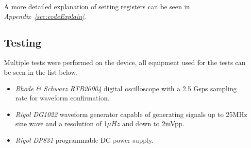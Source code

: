 A more detailed explanation of setting registers can be seen in \textit{Appendix~\ref{sec:codeExplain}}.

\clearpage

\subsection{Testing}









Multiple tests were performed on the device, all equipment used for the tests can be seen in the list below.
\begin{itemize}
    \item \textit{Rhode \& Schwarz RTB20004} digital oscilloscope with a 2.5 Gsps sampling rate for waveform confirmation.
    \item \textit{Rigol DG1022} waveform generator capable of generating signals up to 25MHz sine wave and a resolution of 1$\mu Hz$ and down to 2mVpp.
    \item \textit{Rigol DP831} programmable DC power supply.
\end{itemize}



